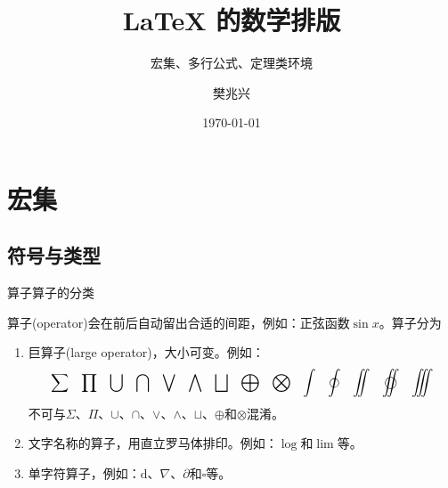 \documentclass[mathserif]{beamer}
\title[数学排版]{\textbf{\songti \LaTeX{} 的数学排版}}
\subtitle{\AmS{} 宏集、多行公式、定理类环境}
\institute{中国科学院大学}
\author{\kaishu 樊兆兴}
\date{\today}
\begin{document}

\begin{frame}
	\maketitle
\end{frame}

\begin{frame}
	\tableofcontents
\end{frame}

\section{\texorpdfstring{\AmS{} 宏集}{AMS宏集}}

\subsection{符号与类型}

\begin{frame}{算子}{算子的分类}

算子(operator)会在前后自动留出合适的间距，例如：正弦函数$\sin x$。算子分为
\begin{enumerate}[(1)]%

\item 巨算子(large operator)，大小可变。例如：
\begin{equation*}
	\begin{aligned}
		\sum && \prod && \bigcup && \bigcap && \bigvee && \bigwedge && \bigsqcup && \bigoplus && \bigotimes && \int && \oint && \iint && \varoiint && \iiint
	\end{aligned}
\end{equation*}
不可与$\Sigma$、$\Pi$、$\cup$、$\cap$、$\vee$、$\wedge$、$\sqcup$、$\oplus$和$\otimes$混淆。

\item 文字名称的算子，用直立罗马体排印。例如：$\log$和$\lim$等。

\item 单字符算子，例如：$\mathrm{d}$、$\nabla$、$\partial$和$\square$等。

\end{enumerate}
\end{frame}
\end{document}
